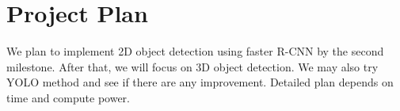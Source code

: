 \section{Project Plan}
We plan to implement 2D object detection using faster R-CNN by the second milestone. After that, we will focus on 3D object detection. We may also try YOLO\cite{yolo} method and see if there are any improvement. Detailed plan depends on time and compute power.